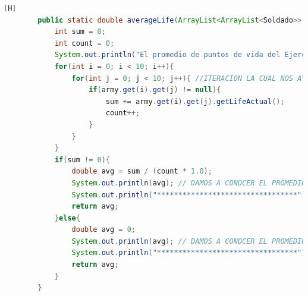 \documentclass{article}
\begin{document}
	\begin{lstlisting}[language=java,caption={Las lineas de codigos del metodo creado:}][H]
		public static double averageLife(ArrayList<ArrayList<Soldado>> army , int num){
			int sum = 0;
			int count = 0;
			System.out.println("El promedio de puntos de vida del Ejercito " + num + " es: ");
			for(int i = 0; i < 10; i++){
				for(int j = 0; j < 10; j++){ //ITERACION LA CUAL NOS AYUDA A PASAR POR TODOS LOS SOLDADOS DE CADA EJERCITO
					if(army.get(i).get(j) != null){ 
						sum += army.get(i).get(j).getLifeActual();
						count++;
					}
				}
			}
			if(sum != 0){
				double avg = sum / (count * 1.0);
				System.out.println(avg); // DAMOS A CONOCER EL PROMEDIO DE VIDA DE CADA EJERCITO 
				System.out.println("*********************************");
				return avg;
			}else{
				double avg = 0;
				System.out.println(avg); // DAMOS A CONOCER EL PROMEDIO DE VIDA DE CADA EJERCITO 
				System.out.println("*********************************");
				return avg;
			}
		}

	\end{lstlisting}
\end{document}
